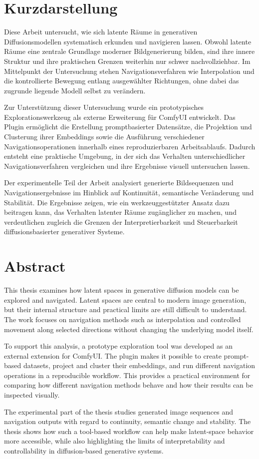 \thispagestyle{empty}
\section*{Kurzdarstellung}
\label{sec:kurzdarstellung}

Diese Arbeit untersucht, wie sich latente Räume in generativen Diffusionsmodellen systematisch erkunden und navigieren lassen. Obwohl latente Räume eine zentrale Grundlage moderner Bildgenerierung bilden, sind ihre innere Struktur und ihre praktischen Grenzen weiterhin nur schwer nachvollziehbar. Im Mittelpunkt der Untersuchung stehen Navigationsverfahren wie Interpolation und die kontrollierte Bewegung entlang ausgewählter Richtungen, ohne dabei das zugrunde liegende Modell selbst zu verändern.

Zur Unterstützung dieser Untersuchung wurde ein prototypisches Explorationswerkzeug als externe Erweiterung für ComfyUI entwickelt. Das Plugin ermöglicht die Erstellung promptbasierter Datensätze, die Projektion und Clusterung ihrer Embeddings sowie die Ausführung verschiedener Navigationsoperationen innerhalb eines reproduzierbaren Arbeitsablaufs. Dadurch entsteht eine praktische Umgebung, in der sich das Verhalten unterschiedlicher Navigationsverfahren vergleichen und ihre Ergebnisse visuell untersuchen lassen.

Der experimentelle Teil der Arbeit analysiert generierte Bildsequenzen und Navigationsergebnisse im Hinblick auf Kontinuität, semantische Veränderung und Stabilität. Die Ergebnisse zeigen, wie ein werkzeuggestützter Ansatz dazu beitragen kann, das Verhalten latenter Räume zugänglicher zu machen, und verdeutlichen zugleich die Grenzen der Interpretierbarkeit und Steuerbarkeit diffusionsbasierter generativer Systeme.


\section*{Abstract}
\label{sec:abstract}

This thesis examines how latent spaces in generative diffusion models can be explored and navigated. Latent spaces are central to modern image generation, but their internal structure and practical limits are still difficult to understand. The work focuses on navigation methods such as interpolation and controlled movement along selected directions without changing the underlying model itself.

To support this analysis, a prototype exploration tool was developed as an external extension for ComfyUI. The plugin makes it possible to create prompt-based datasets, project and cluster their embeddings, and run different navigation operations in a reproducible workflow. This provides a practical environment for comparing how different navigation methods behave and how their results can be inspected visually.

The experimental part of the thesis studies generated image sequences and navigation outputs with regard to continuity, semantic change and stability. The thesis shows how such a tool-based workflow can help make latent-space behavior more accessible, while also highlighting the limits of interpretability and controllability in diffusion-based generative systems.
